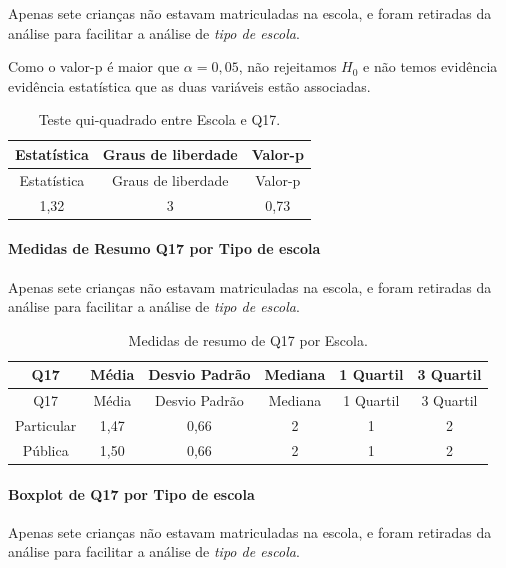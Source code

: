 \documentclass[]{article}
\let\oldparagraph\paragraph
\renewcommand{\paragraph}[1]{\oldparagraph{#1}\mbox{}}
\begin{document}
Apenas sete crianças não estavam matriculadas na escola, e foram retiradas da análise para facilitar a análise de \emph{tipo de escola}.

Como o valor-p é maior que \(\alpha=0,05\), não rejeitamos \(H_0\) e não temos evidência evidência estatística que as duas variáveis estão associadas.

\begin{longtable}[]{@{}ccc@{}}
\caption{\label{tab:unnamed-chunk-211}Teste qui-quadrado entre Escola e Q17.}\tabularnewline
\toprule
Estatística & Graus de liberdade & Valor-p\tabularnewline
\midrule
\endfirsthead
\toprule
Estatística & Graus de liberdade & Valor-p\tabularnewline
\midrule
\endhead
1,32 & 3 & 0,73\tabularnewline
\bottomrule
\end{longtable}

\cleardoublepage

\hypertarget{medidas-de-resumo-q17-por-tipo-de-escola}{%
\paragraph{Medidas de Resumo Q17 por Tipo de escola}\label{medidas-de-resumo-q17-por-tipo-de-escola}}

Apenas sete crianças não estavam matriculadas na escola, e foram retiradas da análise para facilitar a análise de \emph{tipo de escola}.

\begin{longtable}[]{@{}cccccc@{}}
\caption{\label{tab:unnamed-chunk-212}Medidas de resumo de Q17 por Escola.}\tabularnewline
\toprule
Q17 & Média & Desvio Padrão & Mediana & 1 Quartil & 3 Quartil\tabularnewline
\midrule
\endfirsthead
\toprule
Q17 & Média & Desvio Padrão & Mediana & 1 Quartil & 3 Quartil\tabularnewline
\midrule
\endhead
Particular & 1,47 & 0,66 & 2 & 1 & 2\tabularnewline
Pública & 1,50 & 0,66 & 2 & 1 & 2\tabularnewline
\bottomrule
\end{longtable}

\hypertarget{boxplot-de-q17-por-tipo-de-escola}{%
\paragraph{Boxplot de Q17 por Tipo de escola}\label{boxplot-de-q17-por-tipo-de-escola}}

Apenas sete crianças não estavam matriculadas na escola, e foram retiradas da análise para facilitar a análise de \emph{tipo de escola}.
\end{document}
